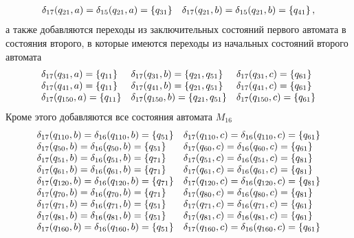 \begin{enumerate}
\begin{align*}
\begin{array}{ll}
			      \delta_{17}(q_{21}, a) =\delta_{15}(q_{21}, a)  =  \left\{q_{31}\right\} & \delta_{17}(q_{21}, b)=\delta_{15}(q_{21}, b)  =  \left\{q_{41}\right\},  \\
		      \end{array}
	      \end{align*}
	      а также добавляются переходы из заключительных состояний первого автомата в состояния второго, в которые имеются переходы из начальных состояний второго автомата
	      \begin{align*}
		      \begin{array}{lll}
			      \delta_{17}(q_{31}, a) = \left\{q_{11}\right\}  & \delta_{17}(q_{31}, b) = \left\{q_{21}, q_{51}\right\}  & \delta_{17}(q_{31}, c) = \left\{q_{61}\right\}  \\
			      \delta_{17}(q_{41}, a) = \left\{q_{11}\right\}  & \delta_{17}(q_{41}, b) = \left\{q_{21}, q_{51}\right\}  & \delta_{17}(q_{41}, c) = \left\{q_{61}\right\}  \\
			      \delta_{17}(q_{150}, a) = \left\{q_{11}\right\} & \delta_{17}(q_{150}, b) = \left\{q_{21}, q_{51}\right\} & \delta_{17}(q_{150}, c) = \left\{q_{61}\right\} \\
		      \end{array}
	      \end{align*}
	      Кроме этого добавляются все состояния автомата \(M_{16}\)
	      \begin{align*}
		      \begin{array}{ll}
			      \delta_{17}(q_{110}, b) = \delta_{16}(q_{110}, b) = \left\{q_{51}\right\} & \delta_{17}(q_{110}, c) = \delta_{16}(q_{110}, c) = \left\{q_{61}\right\} \\
			      \delta_{17}(q_{50}, b)  = \delta_{16}(q_{50}, b)  = \left\{q_{51}\right\} & \delta_{17}(q_{60}, c)  = \delta_{16}(q_{60}, c)  = \left\{q_{61}\right\} \\
			      \delta_{17}(q_{51}, b)  = \delta_{16}(q_{51}, b)  = \left\{q_{71}\right\} & \delta_{17}(q_{51}, c)  = \delta_{16}(q_{51}, c)  = \left\{q_{81}\right\} \\
			      \delta_{17}(q_{61}, b)  = \delta_{16}(q_{61}, b)  = \left\{q_{71}\right\} & \delta_{17}(q_{61}, c)  = \delta_{16}(q_{61}, c)  = \left\{q_{81}\right\} \\
			      \delta_{17}(q_{120}, b) = \delta_{16}(q_{120}, b) = \left\{q_{71}\right\} & \delta_{17}(q_{120}, c) = \delta_{16}(q_{120}, c) = \left\{q_{81}\right\} \\
			      \delta_{17}(q_{70}, b)  = \delta_{16}(q_{70}, b) = \left\{q_{71}\right\}  & \delta_{17}(q_{80}, c) =  \delta_{16}(q_{80}, c) = \left\{q_{81}\right\}  \\
			      \delta_{17}(q_{71}, b) = \delta_{16}(q_{71}, b) = \left\{q_{51}\right\}   & \delta_{17}(q_{71}, c) = \delta_{16}(q_{71}, c) =\left\{q_{61}\right\}    \\
			      \delta_{17}(q_{81}, b) = \delta_{16}(q_{81}, b) = \left\{q_{51}\right\}   & \delta_{17}(q_{81}, c) = \delta_{16}(q_{81}, c) =\left\{q_{61}\right\}    \\
			      \delta_{17}(q_{160}, b) = \delta_{16}(q_{160}, b) = \left\{q_{51}\right\} & \delta_{17}(q_{160}, c) = \delta_{16}(q_{160}, c) = \left\{q_{61}\right\}
		      \end{array}
	      \end{align*}
\end{enumerate}

